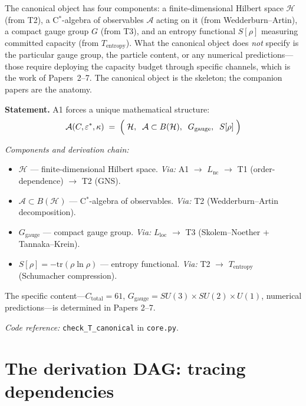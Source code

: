 \documentclass[11pt]{article}
\newenvironment{varlist}{\begin{itemize}[nosep,leftmargin=2em]}{\end{itemize}}
\newcommand{\coderef}[2]{\smallskip\noindent\textit{Code reference:} \texttt{#1} in \texttt{#2}.}
\begin{document}
The canonical object has four components: a finite-dimensional Hilbert space $\mathcal{H}$ (from T2), a C$^*$-algebra of observables $\mathcal{A}$ acting on it (from Wedderburn--Artin), a compact gauge group $G$ (from T3), and an entropy functional $S[\rho]$ measuring committed capacity (from $T_{\mathrm{entropy}}$).  What the canonical object does \emph{not} specify is the particular gauge group, the particle content, or any numerical predictions---those require deploying the capacity budget through specific channels, which is the work of Papers~2--7.  The canonical object is the skeleton; the companion papers are the anatomy.

\begin{tcolorbox}[apfbox, title={$T_{\mathrm{canonical}}$: The Canonical Object Forced by A1}]
\textbf{Statement.}  A1 forces a unique mathematical structure:
\begin{equation}
\mathcal{A}(C, \varepsilon^*, \kappa) \;=\; \Bigl(\;\mathcal{H},\;\; \mathcal{A} \subset B(\mathcal{H}),\;\; G_{\mathrm{gauge}},\;\; S[\rho]\;\Bigr)
\end{equation}

\smallskip\noindent\textit{Components and derivation chain:}
\begin{varlist}
\item $\mathcal{H}$ --- finite-dimensional Hilbert space. \textit{Via:} A1 $\to$ $L_{\mathrm{nc}}$ $\to$ T1 (order-dependence) $\to$ T2 (GNS).
\item $\mathcal{A} \subset B(\mathcal{H})$ --- C$^*$-algebra of observables. \textit{Via:} T2 (Wedderburn--Artin decomposition).
\item $G_{\mathrm{gauge}}$ --- compact gauge group. \textit{Via:} $L_{\mathrm{loc}}$ $\to$ T3 (Skolem--Noether + Tannaka--Krein).
\item $S[\rho] = -\mathrm{tr}(\rho \ln \rho)$ --- entropy functional. \textit{Via:} T2 $\to$ $T_{\mathrm{entropy}}$ (Schumacher compression).
\end{varlist}

\smallskip
The specific content---$C_{\mathrm{total}} = 61$, $G_{\mathrm{gauge}} = SU(3) \times SU(2) \times U(1)$, numerical predictions---is determined in Papers 2--7.

\coderef{check\_T\_canonical}{core.py}
\end{tcolorbox}


\section{The derivation DAG: tracing dependencies}
\end{document}
